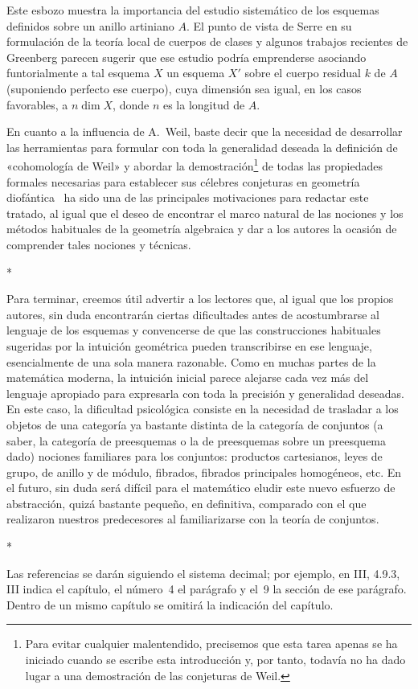 Este esbozo muestra la importancia del estudio sistemático de los esquemas definidos sobre un anillo artiniano $A$.
El punto de vista de Serre en su formulación de la teoría local de cuerpos de clases y algunos trabajos recientes de Greenberg parecen sugerir que ese estudio podría emprenderse asociando funtorialmente a tal esquema $X$ un esquema $X'$ sobre el cuerpo residual $k$ de $A$ (suponiendo perfecto ese cuerpo), cuya dimensión sea igual, en los casos favorables, a $n\dim X$, donde $n$ es la longitud de $A$.

En cuanto a la influencia de A.~Weil, baste decir que la necesidad de desarrollar las herramientas para formular con toda la generalidad deseada la definición de «cohomología de Weil» y abordar la demostración\footnote{Para evitar cualquier malentendido, precisemos que esta tarea apenas se ha iniciado cuando se escribe esta introducción y, por tanto, todavía no ha dado lugar a una demostración de las conjeturas de Weil.} de todas las propiedades formales necesarias para establecer sus célebres conjeturas en geometría diofántica~\cite{I-19} ha sido una de las principales motivaciones para redactar este tratado, al igual que el deseo de encontrar el marco natural de las nociones y los métodos habituales de la geometría algebraica y dar a los autores la ocasión de comprender tales nociones y técnicas.

\bigskip
\begin{center}*\quad*\quad*\end{center}
\bigskip

Para terminar, creemos útil advertir a los lectores que, al igual que los propios autores, sin duda encontrarán ciertas dificultades antes de acostumbrarse al lenguaje de los esquemas y convencerse de que las construcciones habituales sugeridas por la intuición geométrica pueden transcribirse en ese lenguaje, esencialmente de una sola manera razonable.
Como en muchas partes de la matemática moderna, la intuición inicial parece alejarse cada vez más del lenguaje apropiado para expresarla con toda la precisión y generalidad deseadas.
En este caso, la dificultad psicológica consiste en la necesidad de trasladar a los objetos de una categoría ya bastante distinta de la categoría de conjuntos (a saber, la categoría de preesquemas o la de preesquemas sobre un preesquema dado) nociones familiares para los conjuntos: productos cartesianos, leyes de grupo, de anillo y de módulo, fibrados, fibrados principales homogéneos, etc.
En el futuro, sin duda será difícil para el matemático eludir este nuevo esfuerzo de abstracción, quizá bastante pequeño, en definitiva, comparado con el que realizaron nuestros predecesores al familiarizarse con la teoría de conjuntos.

\bigskip
\begin{center}*\quad*\quad*\end{center}
\bigskip

Las referencias se darán siguiendo el sistema decimal; por ejemplo, en III, 4.9.3, III indica el capítulo, el número~4 el parágrafo y el~9 la sección de ese parágrafo.
Dentro de un mismo capítulo se omitirá la indicación del capítulo.
